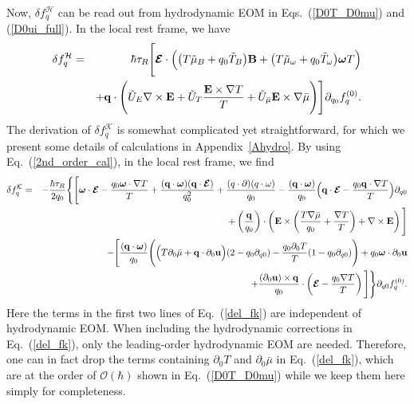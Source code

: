 \documentclass[aps,prd,showkeys,preprint,amsmath,amssymb,nofootinbib]{revtex4-1}
\begin{document}
Now, $\delta f^{\mathcal{H}}_q$ can be read out from hydrodynamic EOM in Eqs.~(\ref{D0T_D0mu}) and (\ref{D0ui_full}). In the local rest frame, we have 
\begin{eqnarray}\nonumber
\delta f^{\mathcal{H}}_q&=&\hbar\tau_R\Bigg[\bm{\mathcal{E}}\cdot\Big(\big(T\tilde{\mu}_B+q_0\tilde{T}_B\big){\bf B}
+\big(T\tilde{\mu}_{\omega}+q_0\tilde{T}_{\omega}\big)\bm{\omega}T\Big)
\\
&&
+{\bf q}\cdot\Bigg(\tilde{U}_E{\bf\nabla \times E}+\tilde{U}_T\frac{{\bf E}\times\nabla T}{T}+\tilde{U}_{\bar{\mu}}{\bf E\times\nabla}\bar{\mu}\Bigg)\Bigg]\partial_{q_0}f^{(0)}_q.
\end{eqnarray}
The derivation of $\delta f^{\mathcal{K}}_q$ is somewhat complicated yet straightforward, for which we present some details of calculations in Appendix~\ref{Ahydro}. By using Eq.~(\ref{2nd_order_cal}), in the local rest frame, we find 
\begin{eqnarray}\nonumber\label{del_fk}
\delta f^{\mathcal{K}}_q&=&-\frac{\hbar\tau_R}{2q_0}
\Bigg\{\Bigg[\bm{\omega}\cdot\bm{\mathcal{E}}-\frac{q_0\bm{\omega}\cdot\nabla T}{T}
+\frac{({\bf q}\cdot\bm{\omega})({\bf q}\cdot\bm{\mathcal{E}})}{q_0^2}
+\frac{(q\cdot\partial)(q\cdot\omega)}{q_0}
-\frac{({\bf q}\cdot\bm{\omega})}{q_0}\Big({\bf q}\cdot\bm{\mathcal{E}}-\frac{q_0{\bf q\cdot\nabla}T}{T}\Big)\partial_{q0}
\\\nonumber
&&
+\left(\frac{{\bf q}}{q_0}\right)\cdot\left({\bf E}\times\left(\frac{T\nabla\bar{\mu}}{q_0}+\frac{\nabla T}{T}\right)+\nabla\times{\bf E}\right)\Bigg]
\\\nonumber
&&
-\Bigg[\frac{({\bf q\cdot\bm\omega})}{q_0}\Bigg(\Big(T\partial_0\bar{\mu}+{\bf q}\cdot\partial_0 {\bf u}\Big)(2-q_0\partial_{q0})-\frac{q_0\partial_0T}{T}(1-q_0\partial_{q0})\Bigg)
+q_0\bm{\omega}\cdot\partial_0{\bf u}
\\
&&
+\frac{(\partial_0{\bf u})\times {\bf q}}{q_0}\cdot \left(\bm{\mathcal{E}}-\frac{q_0\nabla T}{T}\right)
\Bigg]
\Bigg\}\partial_{q0}f^{(0)}_q.
\end{eqnarray}
Here the terms in the first two lines of Eq.~(\ref{del_fk}) are independent of hydrodynamic EOM. When including the hydrodynamic corrections in Eq.~(\ref{del_fk}), only the leading-order hydrodynamic EOM are needed. Therefore, one can in fact drop the terms containing $\partial_0T$ and $\partial_0\bar{\mu}$ in Eq.~(\ref{del_fk}), which are at the order of $\mathcal{O}(\hbar)$ shown in Eq.~(\ref{D0T_D0mu}) while we keep them here simply for completeness.  
\end{document}
